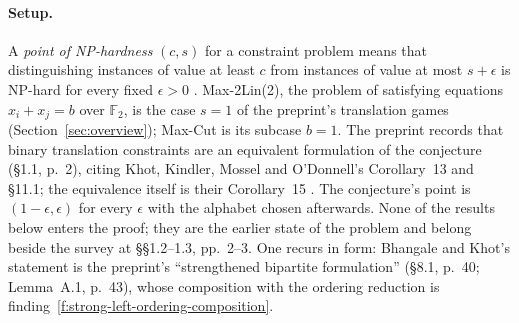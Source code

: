 \documentclass[11pt]{article}
\newcommand{\ploc}[2]{#1}
\newcommand{\sloc}[2]{\cite[#2]{#1}}
\newcounter{finding}
\begin{document}
\paragraph{Setup.}
A \emph{point of NP-hardness} $(c,s)$ for a constraint problem means that
distinguishing instances of value at least $c$ from instances of value at
most $s+\epsilon$ is NP-hard for every fixed $\epsilon>0$
\sloc{ODonnellWright2012-NewPointNPHardnessUniqueGames}{Def.~2.3, p.~5}.
Max-2Lin(2), the problem of satisfying equations $x_i+x_j=b$ over
$\mathbb F_2$, is the case $s=1$ of the preprint's translation games
(Section~\ref{sec:overview}); Max-Cut is its subcase $b=1$. The preprint
records that binary translation constraints are an equivalent formulation
of the conjecture (\ploc{\S1.1, p.~2}{00-introduction.tex:44--46}), citing
Khot, Kindler, Mossel and O'Donnell's Corollary~13 and \S11.1; the
equivalence itself is their Corollary~15
\sloc{KhotEtAl2005-OptimalInapproxMaxCut}{Cor.~13 and Cor.~15, p.~15; \S11.1, p.~26}.
The conjecture's point is $(1-\epsilon,\epsilon)$ for every $\epsilon$ with
the alphabet chosen afterwards. None of the results below enters the proof;
they are the earlier state of the problem and belong beside the survey at
\ploc{\S\S1.2--1.3, pp.~2--3}{00-introduction.tex:57--131}. One recurs in
form: Bhangale and Khot's statement is the preprint's ``strengthened
bipartite formulation'' (\ploc{\S8.1, p.~40}{07-consequences.tex:49--54};
\ploc{Lemma~A.1, p.~43}{finite-consequences.tex:22--34}), whose composition
with the ordering reduction is finding~\ref{f:strong-left-ordering-composition}.
\end{document}
